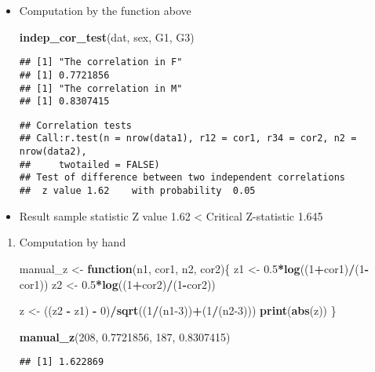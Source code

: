 \documentclass[
]{article}
\newenvironment{Shaded}{\begin{snugshade}}{\end{snugshade}}
\newcommand{\ControlFlowTok}[1]{\textcolor[rgb]{0.13,0.29,0.53}{\textbf{#1}}}
\newcommand{\DecValTok}[1]{\textcolor[rgb]{0.00,0.00,0.81}{#1}}
\newcommand{\FloatTok}[1]{\textcolor[rgb]{0.00,0.00,0.81}{#1}}
\newcommand{\KeywordTok}[1]{\textcolor[rgb]{0.13,0.29,0.53}{\textbf{#1}}}
\newcommand{\NormalTok}[1]{#1}
\newcommand{\OperatorTok}[1]{\textcolor[rgb]{0.81,0.36,0.00}{\textbf{#1}}}
\newcommand{\StringTok}[1]{\textcolor[rgb]{0.31,0.60,0.02}{#1}}
\begin{document}
\begin{itemize}
\item
  Computation by the function above

\begin{Shaded}
\begin{Highlighting}[]
\KeywordTok{indep_cor_test}\NormalTok{(dat, sex, G1, G3)}
\end{Highlighting}
\end{Shaded}

\begin{verbatim}
## [1] "The correlation in F"
## [1] 0.7721856
## [1] "The correlation in M"
## [1] 0.8307415
\end{verbatim}

\begin{verbatim}
## Correlation tests 
## Call:r.test(n = nrow(data1), r12 = cor1, r34 = cor2, n2 = nrow(data2), 
##     twotailed = FALSE)
## Test of difference between two independent correlations 
##  z value 1.62    with probability  0.05
\end{verbatim}
\item
  Result sample statistic Z value 1.62 \textless{} Critical Z-statistic
  1.645\\
\end{itemize}

\begin{enumerate}
\def\labelenumi{\arabic{enumi}.}
\setcounter{enumi}{1}
\item
  Computation by hand

\begin{Shaded}
\begin{Highlighting}[]
\NormalTok{manual_z <-}\StringTok{ }\ControlFlowTok{function}\NormalTok{(n1, cor1, n2, cor2)\{}
\NormalTok{  z1 <-}\StringTok{ }\FloatTok{0.5}\OperatorTok{*}\KeywordTok{log}\NormalTok{((}\DecValTok{1}\OperatorTok{+}\NormalTok{cor1)}\OperatorTok{/}\NormalTok{(}\DecValTok{1}\OperatorTok{-}\NormalTok{cor1))}
\NormalTok{  z2 <-}\StringTok{ }\FloatTok{0.5}\OperatorTok{*}\KeywordTok{log}\NormalTok{((}\DecValTok{1}\OperatorTok{+}\NormalTok{cor2)}\OperatorTok{/}\NormalTok{(}\DecValTok{1}\OperatorTok{-}\NormalTok{cor2))}

\NormalTok{  z <-}\StringTok{ }\NormalTok{((z2 }\OperatorTok{-}\StringTok{ }\NormalTok{z1) }\OperatorTok{-}\StringTok{ }\DecValTok{0}\NormalTok{)}\OperatorTok{/}\KeywordTok{sqrt}\NormalTok{((}\DecValTok{1}\OperatorTok{/}\NormalTok{(n1}\DecValTok{-3}\NormalTok{))}\OperatorTok{+}\NormalTok{(}\DecValTok{1}\OperatorTok{/}\NormalTok{(n2}\DecValTok{-3}\NormalTok{)))}
  \KeywordTok{print}\NormalTok{(}\KeywordTok{abs}\NormalTok{(z))}
\NormalTok{\}}

\KeywordTok{manual_z}\NormalTok{(}\DecValTok{208}\NormalTok{, }\FloatTok{0.7721856}\NormalTok{, }\DecValTok{187}\NormalTok{, }\FloatTok{0.8307415}\NormalTok{)}
\end{Highlighting}
\end{Shaded}

\begin{verbatim}
## [1] 1.622869
\end{verbatim}
\end{enumerate}
\end{document}
